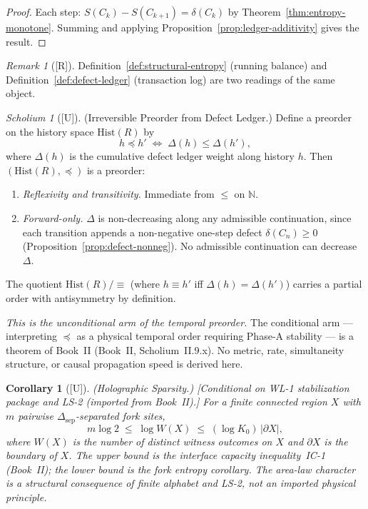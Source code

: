 \documentclass[12pt,oneside]{amsbook}
\theoremstyle{plain}
\newtheorem{corollary}[theorem]{Corollary}
\theoremstyle{definition}
\theoremstyle{remark}
\newtheorem{remark}[theorem]{Remark}
\newtheorem{scholium}[theorem]{Scholium}
\newcommand{\status}[1]{\textup{[#1]}}
\begin{document}
\begin{proof}
Each step: $S(C_k)-S(C_{k+1})=\delta(C_k)$ by
Theorem~\ref{thm:entropy-monotone}.  Summing and applying
Proposition~\ref{prop:ledger-additivity} gives the result.
\end{proof}

\begin{remark}[\status{R}]
Definition~\ref{def:structural-entropy} (running balance) and
Definition~\ref{def:defect-ledger} (transaction log) are two
readings of the same object.
\end{remark}


\begin{scholium}[\status{U}]\label{sch:temporal-preorder}
\textup{(Irreversible Preorder from Defect Ledger.)}
Define a preorder on the history space $\mathrm{Hist}(R)$ by
\[
  h \preceq h' \;\iff\; \Delta(h) \leq \Delta(h'),
\]
where $\Delta(h)$ is the cumulative defect ledger weight along history
$h$.  Then $(\mathrm{Hist}(R), \preceq)$ is a preorder:
\begin{enumerate}[label=\textup{(\roman*)}]
  \item \emph{Reflexivity and transitivity.}  Immediate from $\leq$ on
        $\mathbb{N}$.
  \item \emph{Forward-only.}  $\Delta$ is non-decreasing along any
        admissible continuation, since each transition appends a
        non-negative one-step defect $\delta(C_n) \geq 0$
        (Proposition~\ref{prop:defect-nonneg}).  No admissible
        continuation can decrease $\Delta$.
\end{enumerate}
The quotient $\mathrm{Hist}(R)/{\equiv}$ (where $h \equiv h'$ iff
$\Delta(h) = \Delta(h')$) carries a partial order with antisymmetry by
definition.

\emph{This is the unconditional arm of the temporal preorder.}  The
conditional arm — interpreting $\preceq$ as a physical temporal order
requiring Phase-A stability — is a theorem of Book~II
(Book~II, Scholium~II.9.x).  No metric, rate,
simultaneity structure, or causal propagation speed is derived here.
\end{scholium}


\begin{corollary}[\status{U}]\label{cor:holographic-sparsity}
\textup{(Holographic Sparsity.)}
\textup{[Conditional on WL-1 stabilization package and LS-2 (imported
from Book~II).]}
For a finite connected region $X$ with $m$ pairwise
$\Delta_{\mathrm{sep}}$-separated fork sites,
\[
  m \log 2 \;\leq\; \log W(X) \;\leq\; (\log K_0)\,|\partial X|,
\]
where $W(X)$ is the number of distinct witness outcomes on $X$ and
$\partial X$ is the boundary of $X$.  The upper bound is the interface
capacity inequality~IC-1 (Book~II); the lower bound is the fork
entropy corollary.  The area-law character is a structural consequence
of finite alphabet and LS-2, not an imported physical principle.
\end{corollary}
\end{document}
